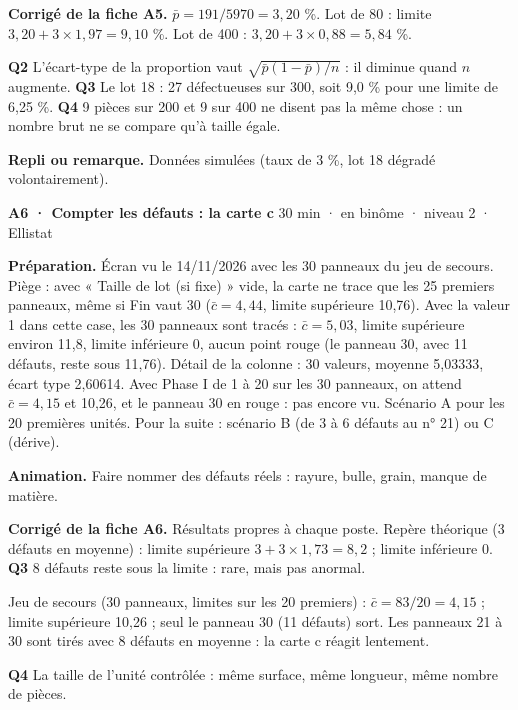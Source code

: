 \textbf{\color{ok}Corrigé de la fiche A5.} $\bar p = 191 / 5970 = 3{,}20$ \%. Lot de 80 : limite $3{,}20 + 3 \times 1{,}97 = 9{,}10$ \%. Lot de 400 : $3{,}20 + 3 \times 0{,}88 = 5{,}84$ \%.\par \textbf{Q2} L'écart-type de la proportion vaut $\sqrt{\bar p(1-\bar p)/n}$ : il diminue quand $n$ augmente. \textbf{Q3} Le lot 18 : 27 défectueuses sur 300, soit 9,0 \% pour une limite de 6,25 \%. \textbf{Q4} 9 pièces sur 200 et 9 sur 400 ne disent pas la même chose : un nombre brut ne se compare qu'à taille égale.\par
{\small\textbf{Repli ou remarque.} Données simulées (taux de 3 \%, lot 18 dégradé volontairement).}\par
\vspace{3pt}
\begin{tcolorbox}[act]\textbf{A6 · Compter les défauts : la carte c} \hfill {\small 30 min · en binôme · niveau 2 · Ellistat}\end{tcolorbox}
\textbf{Préparation.} Écran vu le 14/11/2026 avec les 30 panneaux du jeu de secours. Piège : avec « Taille de lot (si fixe) » vide, la carte ne trace que les 25 premiers panneaux, même si Fin vaut 30 ($\bar c = 4{,}44$, limite supérieure 10,76). Avec la valeur 1 dans cette case, les 30 panneaux sont tracés : $\bar c = 5{,}03$, limite supérieure environ 11,8, limite inférieure 0, aucun point rouge (le panneau 30, avec 11 défauts, reste sous 11,76). Détail de la colonne : 30 valeurs, moyenne 5,03333, écart type 2,60614. Avec Phase I de 1 à 20 sur les 30 panneaux, on attend $\bar c = 4{,}15$ et 10,26, et le panneau 30 en rouge : pas encore vu. Scénario A pour les 20 premières unités. Pour la suite : scénario B (de 3 à 6 défauts au n° 21) ou C (dérive).\par
\textbf{Animation.} Faire nommer des défauts réels : rayure, bulle, grain, manque de matière.\par
\textbf{\color{ok}Corrigé de la fiche A6.} Résultats propres à chaque poste. Repère théorique (3 défauts en moyenne) : limite supérieure $3 + 3 \times 1{,}73 = 8{,}2$ ; limite inférieure 0. \textbf{Q3} 8 défauts reste sous la limite : rare, mais pas anormal.\par Jeu de secours (30 panneaux, limites sur les 20 premiers) : $\bar c = 83 / 20 = 4{,}15$ ; limite supérieure 10,26 ; seul le panneau 30 (11 défauts) sort. Les panneaux 21 à 30 sont tirés avec 8 défauts en moyenne : la carte c réagit lentement.\par \textbf{Q4} La taille de l'unité contrôlée : même surface, même longueur, même nombre de pièces.\par
